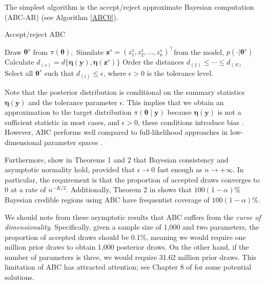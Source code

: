 The simplest algorithm is the accept/reject approximate Bayesian computation (ABC-AR) (see Algorithm \ref{ABC0}).

\begin{algorithm}
	\caption{Accept/reject ABC}\label{ABC0}
	\begin{algorithmic}[1]
		\State Draw ${\boldsymbol {\theta} }^{s}$ from $\pi({ \boldsymbol{\theta} }),$
		\State Simulate ${\boldsymbol z}^{s}=(z_{1}^{s},z_{2}^{s},...,z_{n}^{s})^{\top}$from the model, $p(\cdot|{\boldsymbol{\theta} }^{s})$
		\State Calculate
		$d_{(s)}=d\{{\boldsymbol\eta }({\boldsymbol y}),{\boldsymbol \eta }({\boldsymbol z}^{s})\}$
		\EndFor
		\State Order the distances $d_{(1)}\leq\cdots\leq d_{(S)}$
		\State Select all $\boldsymbol{\theta}^s$ such that $d_{(i)}\leq \epsilon$, where $\epsilon>0$ is the tolerance level. 
	\end{algorithmic}
\end{algorithm}

Note that the posterior distribution is conditional on the summary statistics \( \boldsymbol{\eta}(\boldsymbol{y}) \) and the tolerance parameter \( \epsilon \). This implies that we obtain an approximation to the target distribution \( \pi(\boldsymbol{\theta} \mid \boldsymbol{y}) \) because \( \boldsymbol{\eta}(\boldsymbol{y}) \) is not a sufficient statistic in most cases, and \( \epsilon > 0 \), these conditions introduce bias \cite{blum2010approximate}. However, ABC performs well compared to full-likelihood approaches in low-dimensional parameter spaces \cite{beaumont2002approximate}.

Furthermore, \cite{frazier2018asymptotic} show in Theorems 1 and 2 that Bayesian consistency and asymptotic normality hold, provided that \( \epsilon \to 0 \) fast enough as \( n \to +\infty \). In particular, the requirement is that the proportion of accepted draws converges to 0 at a rate of \( n^{-K / 2} \). Additionally, Theorem 2 in \cite{frazier2018asymptotic} shows that \( 100(1 -\alpha)\% \) Bayesian credible regions using ABC have frequentist coverage of \( 100(1 -\alpha)\% \). 

We should note from these asymptotic results that ABC suffers from the \textit{curse of dimensionality}. Specifically, given a sample size of 1,000 and two parameters, the proportion of accepted draws should be 0.1\%, meaning we would require one million prior draws to obtain 1,000 posterior draws. On the other hand, if the number of parameters is three, we would require 31.62 million prior draws. This limitation of ABC has attracted attention; see Chapter 8 of \cite{sisson2018handbook} for some potential solutions.

